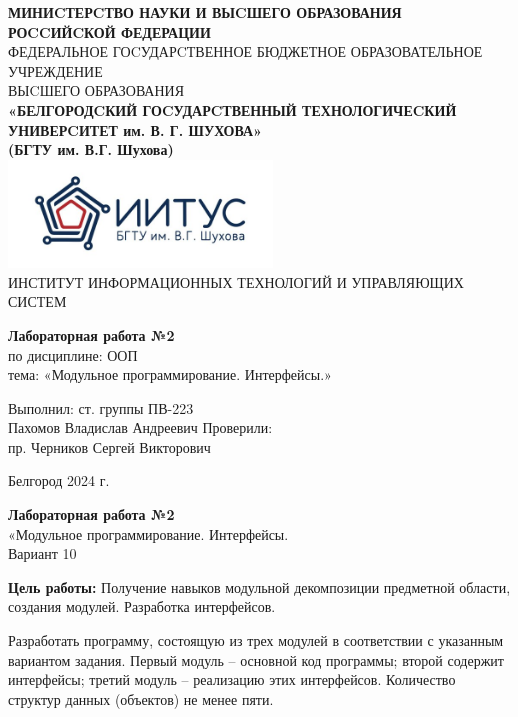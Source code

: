 \documentclass[a4paper,14pt]{extarticle}
\newcommand\textbox[1]{
	\parbox{.45\textwidth}{#1}
}
\begin{document}
\begin{center}
    \small{
        \textbf{МИНИCТЕРCТВО НАУКИ И ВЫCШЕГО ОБРАЗОВАНИЯ РОCCИЙCКОЙ ФЕДЕРАЦИИ}\\
        ФЕДЕРАЛЬНОЕ ГОCУДАРCТВЕННОЕ БЮДЖЕТНОЕ ОБРАЗОВАТЕЛЬНОЕ УЧРЕЖДЕНИЕ\\ВЫCШЕГО ОБРАЗОВАНИЯ \\
        \textbf{«БЕЛГОРОДCКИЙ ГОCУДАРCТВЕННЫЙ ТЕХНОЛОГИЧЕCКИЙ\\УНИВЕРCИТЕТ им. В. Г. ШУХОВА»\\ (БГТУ им. В.Г. Шухова)} \\
        \bigbreak
        \includegraphics[width=70mm]{log}\\
        ИНСТИТУТ ИНФОРМАЦИОННЫХ ТЕХНОЛОГИЙ И УПРАВЛЯЮЩИХ СИСТЕМ\\}
\end{center}

\vfill
\begin{center}
    \large{
        \textbf{
            Лабораторная работа №2}}\\
    \normalsize{
        по дисциплине: ООП \\
        тема: «Модульное программирование. Интерфейсы.»}
\end{center}
\vfill
\hfill\textbox{
    Выполнил: ст. группы ПВ-223\\Пахомов Владислав Андреевич
    \bigbreak
    Проверили: \\пр. Черников Сергей Викторович
}
\vfill\begin{center}
    Белгород 2024 г.
\end{center}
\newpage
\begin{center}
    \textbf{Лабораторная работа №2}\\
    «Модульное программирование. Интерфейсы.\\
    Вариант 10
\end{center}
\textbf{Цель работы: }Получение навыков модульной декомпозиции
предметной области, создания модулей. Разработка интерфейсов.

Разработать программу, состоящую из трех модулей в
соответствии с указанным вариантом задания. Первый модуль – основной
код программы; второй содержит интерфейсы; третий модуль – реализацию
этих интерфейсов. Количество структур данных (объектов) не менее пяти.\\
\end{document}
